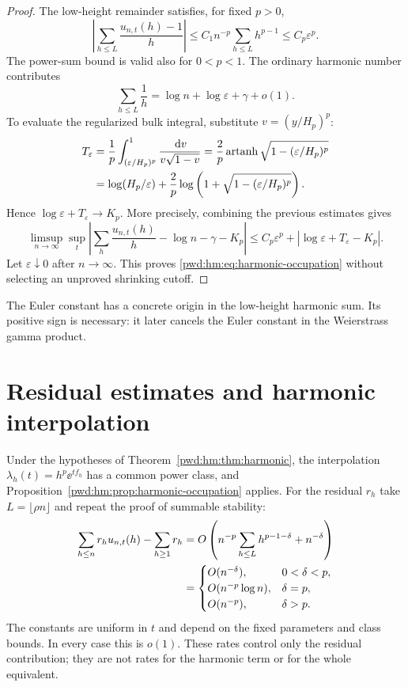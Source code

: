 \documentclass[11pt,letterpaper]{article}
\numberwithin{equation}{section}
\theoremstyle{remark}\newtheorem{remark}[theorem]{Remark}
\begin{document}
\begin{proof}
The low-height remainder satisfies, for fixed $p>0$,
\begin{equation}\label{pwd:hm:eq:low-harmonic}
 \left|\sum_{h\le L}\frac{u_{n,t}(h)-1}{h}\right|
 \le C_1n^{-p}\sum_{h\le L}h^{p-1}\le C_p\varepsilon^p.
\end{equation}
The power-sum bound is valid also for $0<p<1$. The ordinary harmonic number contributes
\[
 \sum_{h\le L}\frac1h=\log n+\log\varepsilon+\gamma+o(1).
\]
To evaluate the regularized bulk integral, substitute $v=(y/H_p)^p$:
\begin{align}\label{pwd:hm:eq:T-epsilon}
 T_\varepsilon
 &=\frac1p\int_{(\varepsilon/H_p)^p}^1\frac{\,\mathrm d v}{v\sqrt{1-v}}
 =\frac2p\operatorname{artanh}\sqrt{1-(\varepsilon/H_p)^p}\notag\\
 &=\log(H_p/\varepsilon)
   +\frac2p\log\left(1+\sqrt{1-(\varepsilon/H_p)^p}\right).
\end{align}
Hence $\log\varepsilon+T_\varepsilon\to K_p$. More precisely, combining the previous estimates gives
\[
 \limsup_{n\to\infty}\sup_t\left|\sum_h\frac{u_{n,t}(h)}h-\log n-\gamma-K_p\right|
 \le C_p\varepsilon^p+|\log\varepsilon+T_\varepsilon-K_p|.
\]
Let $\varepsilon\downarrow0$ after $n\to\infty$. This proves \eqref{pwd:hm:eq:harmonic-occupation} without selecting an unproved shrinking cutoff.
\end{proof}
The Euler constant has a concrete origin in the low-height harmonic sum. Its positive sign is necessary: it later cancels the Euler constant in the Weierstrass gamma product.

\section{Residual estimates and harmonic interpolation}\label{pwd:hm:sec:harmonic-proof}
Under the hypotheses of Theorem~\ref{pwd:hm:thm:harmonic}, the interpolation $\lambda_h(t)=h^p\ee^{tf_h}$ has a common power class, and Proposition~\ref{pwd:hm:prop:harmonic-occupation} applies. For the residual $r_h$ take $L=\lfloor\rho n\rfloor$ and repeat the proof of summable stability:
\begin{align}\label{pwd:hm:eq:residual}
 \sum_{h\le n}r_hu_{n,t}(h)-\sum_{h\ge1}r_h
 &=O\left(n^{-p}\sum_{h\le L}h^{p-1-\delta}+n^{-\delta}\right)\notag\\
 &=\begin{cases}
 O(n^{-\delta}),&0<\delta<p,\\
 O(n^{-p}\log n),&\delta=p,\\
 O(n^{-p}),&\delta>p.
 \end{cases}
\end{align}
The constants are uniform in $t$ and depend on the fixed parameters and class bounds. In every case this is $o(1)$. These rates control only the residual contribution; they are not rates for the harmonic term or for the whole equivalent.
\end{document}
